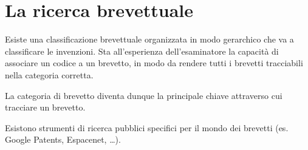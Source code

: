 \section{La ricerca brevettuale}

Esiste una classificazione brevettuale organizzata in modo gerarchico che va a classificare le invenzioni. Sta all'esperienza dell'esaminatore la capacità di associare un codice a un brevetto, in modo da rendere tutti i brevetti tracciabili nella categoria corretta.

La categoria di brevetto diventa dunque la principale chiave attraverso cui tracciare un brevetto.

Esistono strumenti di ricerca pubblici specifici per il mondo dei brevetti (es. Google Patents, Espacenet, \ldots). 